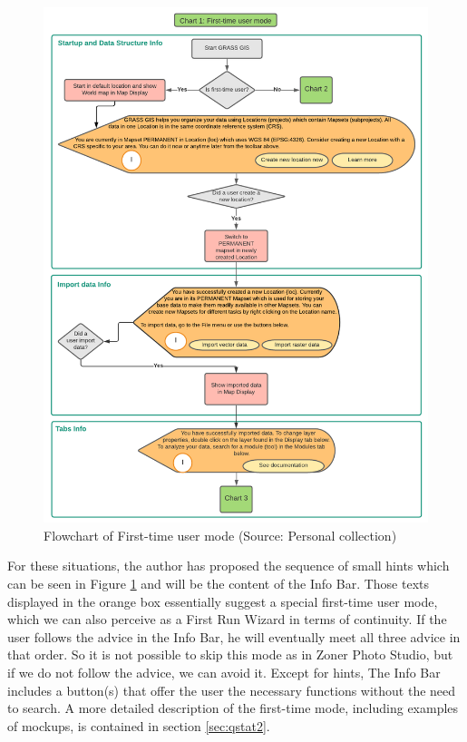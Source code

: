 \documentclass[a4paper,10pt,twoside]{article}
\begin{document}
\vspace{0.3cm}
\begin{figure}[hbt!] 
\begin{center}
\includegraphics[width=15.5cm]{../pictures/first-time_user_diagram.png} 
\caption[Flowchart of First-time user mode]{Flowchart of First-time user mode (Source: Personal collection)}
\label{fig:first-time_user_diagram}
\end{center}
\end{figure}

For these situations, the author has proposed the sequence of small hints which can be seen in Figure \ref{fig:first-time_user_diagram} and will be the content of the Info Bar. Those texts displayed in the orange box essentially suggest a special first-time user mode, which we can also perceive as a First Run Wizard in terms of continuity. If the user follows the advice in the Info Bar, he will eventually meet all three advice in that order. So it is not possible to skip this mode as in Zoner Photo Studio, but if we do not follow the advice, we can avoid it. Except for hints, The Info Bar includes a button(s) that offer the user the necessary functions without the need to search. A more detailed description of the first-time mode, including examples of mockups, is contained in section \ref{sec:qstat2}.
\end{document}
